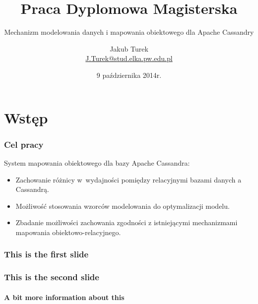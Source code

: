 \documentclass{beamer}
\title[Mechanizm modelowania danych i mapowania obiektowego dla Apache Cassandry]{Praca Dyplomowa Magisterska}
\subtitle{Mechanizm modelowania danych i mapowania obiektowego dla Apache Cassandry}
\author[Jakub Turek]{Jakub Turek \\ {\small \href{mailto:J.Turek@stud.elka.pw.edu.pl}{J.Turek@stud.elka.pw.edu.pl}}}
\date{9 października 2014r.}
\begin{document}
	\section{Wstęp}

	\titlepage

	\begin{frame}
		\frametitle{Cel pracy}

		System mapowania obiektowego dla bazy Apache Cassandra:

		\begin{itemize}
			\item Zachowanie różnicy w~wydajności pomiędzy relacyjnymi bazami danych a Cassandrą.
			\item Możliwość stosowania wzorców modelowania do optymalizacji modelu.
			\item Zbadanie możliwości zachowania zgodności z istniejącymi mechanizmami mapowania obiektowo-relacyjnego.
		\end{itemize}
	\end{frame}

  \begin{frame}
    \frametitle{This is the first slide}
  \end{frame}
  \begin{frame}
    \frametitle{This is the second slide}
    \framesubtitle{A bit more information about this}
  \end{frame}
\end{document}

